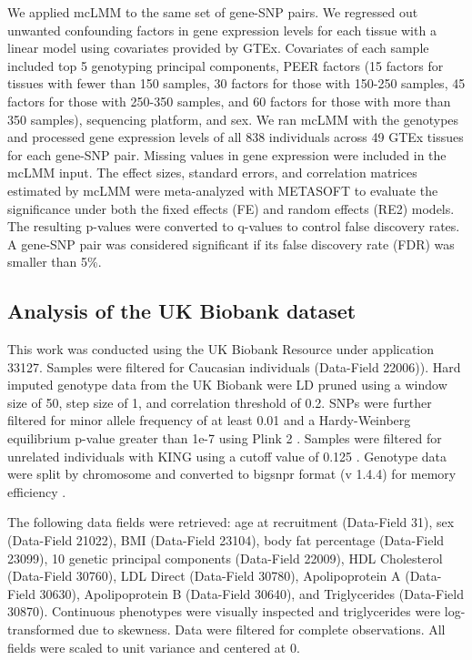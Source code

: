         We applied mcLMM to the same set of gene-SNP pairs. We regressed out unwanted confounding factors in gene expression levels for each tissue with a linear model using covariates provided by GTEx. Covariates of each sample included 
        top 5 genotyping principal components, PEER factors \cite{Stegle2012-zc} (15 factors for tissues with fewer than 150 samples, 30 factors for those with 150-250 samples, 45 factors for those with 250-350 samples, and 60 factors for those with more than 350 samples), sequencing platform, and sex. We ran mcLMM with the genotypes and processed gene expression levels of all 838 individuals across 49 GTEx tissues for each gene-SNP pair. Missing values in gene expression were included in the mcLMM input. The effect sizes, standard errors, and correlation matrices estimated by mcLMM were meta-analyzed with METASOFT to evaluate the significance under both the fixed effects (FE) and random effects (RE2) models. The resulting p-values were converted to q-values \cite{qvalue} to control false discovery rates. A gene-SNP pair was considered significant if its false discovery rate (FDR) was smaller than 5\%.
    
    \subsection{Analysis of the UK Biobank dataset}
        This work was conducted using the UK Biobank Resource under application 33127. Samples were filtered for Caucasian individuals (Data-Field 22006)). Hard imputed genotype data from the UK Biobank were LD pruned using a window size of 50, step size of 1, and correlation threshold of 0.2. SNPs were further filtered for minor allele frequency of at least 0.01 and a Hardy-Weinberg equilibrium p-value greater than 1e-7 using Plink 2 \cite{PLINK2}. Samples were filtered for unrelated individuals with KING using a cutoff value of 0.125 \cite{KING}. Genotype data were split by chromosome and converted to bigsnpr format (v 1.4.4) for memory efficiency \cite{bigsnpr}.
        
        The following data fields were retrieved: age at recruitment (Data-Field 31), sex (Data-Field 21022), BMI (Data-Field 23104), body fat percentage (Data-Field 23099), 10 genetic principal components (Data-Field 22009), HDL Cholesterol (Data-Field 30760), LDL Direct (Data-Field 30780), Apolipoprotein A (Data-Field 30630), Apolipoprotein B (Data-Field 30640), and Triglycerides (Data-Field 30870). Continuous phenotypes were visually inspected and triglycerides were log-transformed due to skewness. Data were filtered for complete observations. All fields were scaled to unit variance and centered at 0. 
        
